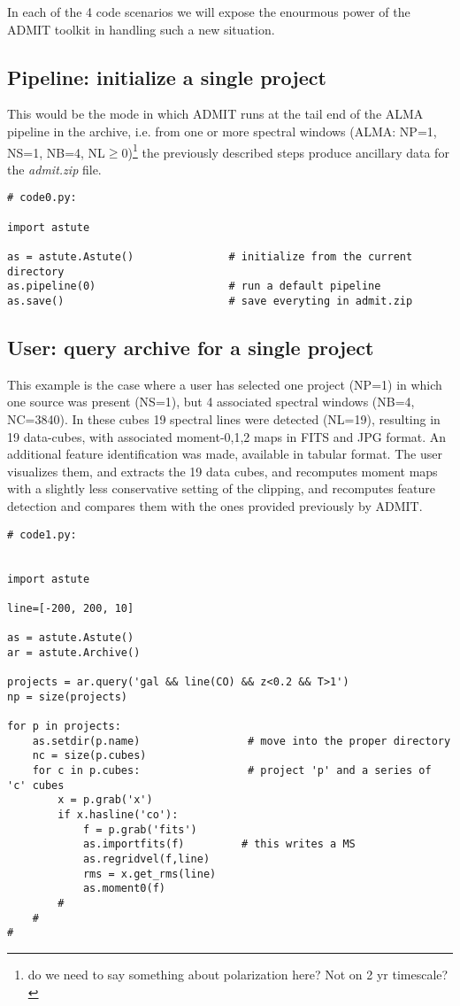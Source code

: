\documentclass[preprint]{aastex} %
\begin{document}
In each of the 4 code scenarios we will expose the enourmous power of the
ADMIT toolkit in handling such a new situation.

\subsection{Pipeline: initialize a single project}

This would be the mode in which ADMIT runs at the tail end of the ALMA pipeline
in the archive, i.e. from one or more spectral
windows (ALMA: NP=1, NS=1, NB=4, NL$\ge$0)\footnote{do we need to say something about 
polarization here? Not on 2 yr timescale?} 
the previously described steps produce ancillary data for the
{\it admit.zip} file.

\footnotesize
\begin{verbatim}
# code0.py:

import astute

as = astute.Astute()               # initialize from the current directory
as.pipeline(0)                     # run a default pipeline
as.save()                          # save everyting in admit.zip

\end{verbatim}
\normalsize


\subsection{User: query archive for a single project}

This example is the case where a user has selected one project (NP=1)
in which one source was present (NS=1), but 4 associated 
spectral windows (NB=4, NC=3840). In these cubes 19 spectral lines 
were detected (NL=19),
resulting in 19 data-cubes, with associated moment-0,1,2 maps in FITS
and JPG format. An additional feature identification was made, available
in tabular format.  The user visualizes them, and extracts the 19
data cubes, and recomputes moment maps with a slightly less conservative
setting of the clipping, and recomputes feature detection and compares
them with the ones provided previously by ADMIT.

\footnotesize
\begin{verbatim}
# code1.py:


import astute

line=[-200, 200, 10]

as = astute.Astute()
ar = astute.Archive()

projects = ar.query('gal && line(CO) && z<0.2 && T>1')
np = size(projects)

for p in projects:
    as.setdir(p.name)                 # move into the proper directory
    nc = size(p.cubes)
    for c in p.cubes:                 # project 'p' and a series of 'c' cubes
        x = p.grab('x')
        if x.hasline('co'):
            f = p.grab('fits')
            as.importfits(f)         # this writes a MS
            as.regridvel(f,line)
            rms = x.get_rms(line)
            as.moment0(f)
        #
    #
#

\end{verbatim}
\normalsize
\end{document}
